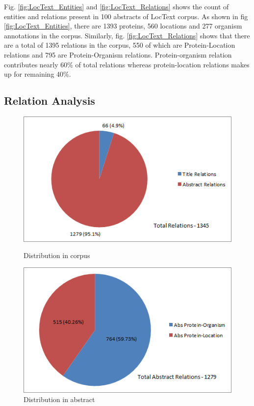 Fig. \ref{fig:LocText_Entities} and \ref{fig:LocText_Relations} shows the count of entities and relations present in 100 abstracts of LocText corpus. As shown in fig \ref{fig:LocText_Entities}, there are 1393 proteins, 560 locations and 277 organism annotations in the corpus. Similarly, fig. \ref{fig:LocText_Relations} shows that there are a total of 1395 relations in the corpus, 550 of which are Protein-Location relations and 795 are Protein-Organism relations. Protein-organism relation contributes nearly 60\% of total relations whereas protein-location relations makes up for remaining 40\%.

\subsection*{Relation Analysis}

\begin{figure}
\centering
\begin{minipage}{.5\textwidth}
  \centering
  \includegraphics[width=.95\textwidth]{figures/Rel_Title_Abs_Distribution.png}
  \caption{Distribution in corpus}
  \label{fig:Rel_Title_Abs}
\end{minipage}%
\begin{minipage}{.5\textwidth}
  \centering
  \includegraphics[width=.95\textwidth]{figures/AbsRel_PO_PL_Distribution.png}
  \caption{Distribution in abstract}
  \label{fig:Rel_Abs_PO_PL}
\end{minipage}
\end{figure}

